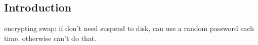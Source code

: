 
\subsection{Introduction}

encrypting swap: if don't need suspend to disk, can use a random password each time. otherwise can't do that.

